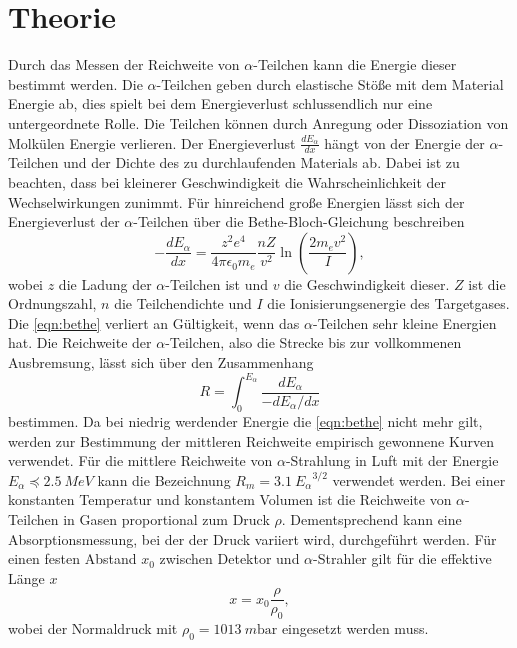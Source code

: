 \section[Theorie]{Theorie \textnormal{\cite{alpha}}}
\label{sec:theorie}

Durch das Messen der Reichweite von $\alpha$-Teilchen kann die Energie dieser bestimmt werden.
Die $\alpha$-Teilchen geben durch elastische Stöße mit dem Material Energie ab, dies spielt bei dem Energieverlust schlussendlich
nur eine untergeordnete Rolle. Die Teilchen können durch Anregung oder Dissoziation von Molkülen Energie verlieren.
Der Energieverlust $\frac{d E_\alpha}{d x}$ hängt von der Energie der $\alpha$-Teilchen und der Dichte des zu durchlaufenden 
Materials ab. Dabei ist zu beachten, dass bei kleinerer Geschwindigkeit die Wahrscheinlichkeit der Wechselwirkungen zunimmt.
Für hinreichend große Energien lässt sich der Energieverlust der $\alpha$-Teilchen über die Bethe-Bloch-Gleichung beschreiben 
\begin{equation}
    -\frac{d E_\alpha}{d x}=\frac{z^2 e^4}{4 \pi \epsilon_0 m_e} \frac{n Z}{v^2} \ln \left(\frac{2 m_e v^2}{I}\right),
    \label{eqn:bethe}
\end{equation}
wobei $z$ die Ladung der $\alpha$-Teilchen ist und $v$ die Geschwindigkeit dieser. $Z$ ist die Ordnungszahl, $n$ die Teilchendichte 
und $I$ die Ionisierungsenergie des Targetgases. Die \autoref{eqn:bethe} verliert an Gültigkeit, wenn das $\alpha$-Teilchen sehr 
kleine Energien hat.
Die Reichweite der $\alpha$-Teilchen, also die Strecke bis zur vollkommenen Ausbremsung, lässt sich über den Zusammenhang
\begin{equation}
    R=\int_0^{E_\alpha} \frac{d E_\alpha}{-d E_\alpha / d x}
    \label{eqn:reichweite}
\end{equation}
bestimmen.
Da bei niedrig werdender Energie die \autoref{eqn:bethe} nicht mehr gilt, werden zur Bestimmung der mittleren Reichweite
empirisch gewonnene Kurven verwendet. Für die mittlere Reichweite von $\alpha$-Strahlung in Luft mit der Energie $E_{\alpha} \preceq \SI{2.5}{MeV}$
kann die Bezeichnung $R_m = \SI{3.1} {E_{\alpha}}^{3/2}$ verwendet werden.
Bei einer konstanten Temperatur und konstantem Volumen ist die Reichweite von $\alpha$-Teilchen in Gasen proportional zum Druck $\rho$.
Dementsprechend kann eine Absorptionsmessung, bei der der Druck variiert wird, durchgeführt werden. Für einen festen
Abstand $x_0$ zwischen Detektor und $\alpha$-Strahler gilt für die effektive Länge $x$ 
\begin{equation}
    x = x_0 \frac{\rho}{\rho_0},
	\label{eqn:effektiv}
\end{equation}
wobei der Normaldruck mit $\rho_0 = \SI{1013}{m\bar}$ eingesetzt werden muss.

